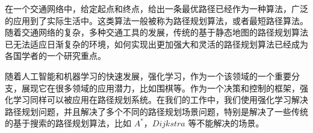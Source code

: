 \documentclass{standalone}
\begin{document}
	
\begin{chineseabstract}

在一个交通网络中，给定起点和终点，给出一条最优路径已经作为一种算法，广泛的应用到了实际生活中。这类算法一般被称为路径规划算法，或者最短路径算法。随着交通网络的复杂，多种交通工具的发展，传统的基于静态地图的路径规划算法已无法适应日渐复杂的环境，如何实现出更加强大和灵活的路径规划算法已经成为各国学者的一个研究重点。

随着人工智能和机器学习的快速发展，强化学习，作为一个该领域的一个重要分支，展现它在很多领域的应用潜力，比如围棋等。作为一个决策和控制的框架，强化学习同样可以被应用在路径规划系统。在我们的工作中，我们使用强化学习解决路径规划问题，并且解决了多个不同的路径规划场景问题，特别是解决了一些传统的基于搜索的路径规划算法，比如 $A^{*}$，$Dijkstra$ 等不能解决的场景。

\end{chineseabstract}
\end{document}
